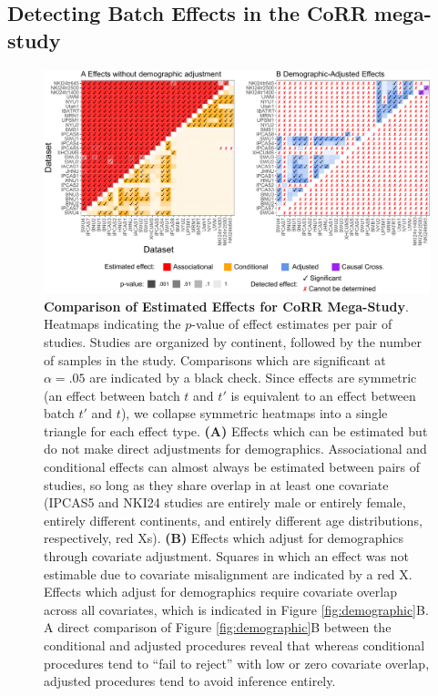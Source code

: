 \subsection{Detecting Batch Effects in the CoRR mega-study}

\begin{figure}[h]
    \centering
    \includegraphics[width=\linewidth]{Figures/Content/raw_pairwise.pdf}
    \caption{\textbf{Comparison of Estimated Effects for CoRR Mega-Study}. Heatmaps indicating the $p$-value of effect estimates per pair of studies. Studies are organized by continent, followed by the number of samples in the study. Comparisons which are significant at $\alpha=.05$ are indicated by a black check. Since effects are symmetric (an effect between batch $t$ and $t'$ is equivalent to an effect between batch $t'$ and $t$), we collapse symmetric heatmaps into a single triangle for each effect type. \textbf{(A)} Effects which can be estimated but do not make direct adjustments for demographics. Associational and conditional effects can almost always be estimated between pairs of studies, so long as they share overlap in at least one covariate (IPCAS5 and NKI24 studies are entirely male or entirely female, entirely different continents, and entirely different age distributions, respectively, red Xs). \textbf{(B)} Effects which adjust for demographics through covariate adjustment. Squares in which an effect was not estimable due to covariate misalignment are indicated by a red X. Effects which adjust for demographics require covariate overlap across all covariates, which is indicated in Figure \ref{fig:demographic}B. A direct comparison of Figure \ref{fig:demographic}B between the conditional and adjusted procedures reveal that whereas conditional procedures tend to ``fail to reject'' with low or zero covariate overlap, adjusted procedures tend to avoid inference entirely.
    }
    \label{fig:raw_pairwise}
\end{figure}


